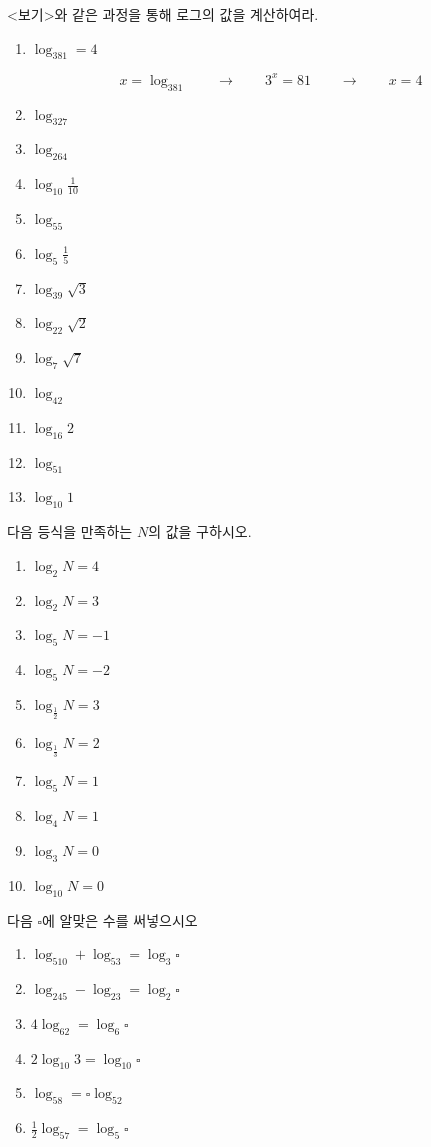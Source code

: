 \documentclass[a4paper]{oblivoir}
\begin{document}
%
\prob
<보기>와 같은 과정을 통해 로그의 값을 계산하여라.
\begin{enumerate}[(1)]
\item
\(\log_381=4\)
\begin{mdframed}[frametitle=<보기>]
\[x=\log_381\qquad\longrightarrow\qquad 3^x=81\qquad\longrightarrow\qquad x=4\]
\end{mdframed}
\item
\(\log_327\)
\item
\(\log_264\)
\item
\(\log_{10}\frac1{10}\)
\item
\(\log_55\)
\item
\(\log_5\frac15\)
\item
\(\log_39\sqrt3\)
\item
\(\log_22\sqrt2\)
\item
\(\log_7\sqrt7\)
\item
\(\log_42\)
\item
\(\log_{16}2\)
\item
\(\log_51\)
\item
\(\log_{10}1\)
\end{enumerate}

%
\prob
다음 등식을 만족하는 \(N\)의 값을 구하시오.
\begin{enumerate}[(1)]
\item
\(\log_2N=4\)
\item
\(\log_2N=3\)
\item
\(\log_5N=-1\)
\item
\(\log_5N=-2\)
\item
\(\log_{\frac12}N=3\)
\item
\(\log_{\frac13}N=2\)
\item
\(\log_5N=1\)
\item
\(\log_4N=1\)
\item
\(\log_3N=0\)
\item
\(\log_{10}N=0\)
\end{enumerate}

%
\prob
다음 \(\square\)에 알맞은 수를 써넣으시오
\begin{enumerate}[(1)]
\item
\(\log_510+\log_53=\log_3\square\)
\item
\(\log_245-\log_23=\log_2\square\)
\item
\(4\log_62=\log_6\square\)
\item
\(2\log_{10}3=\log_{10}\square\)
\item
\(\log_58=\square\log_52\)
\item
\(\frac12\log_57=\log_5\square\)
\end{enumerate}
\end{document}
